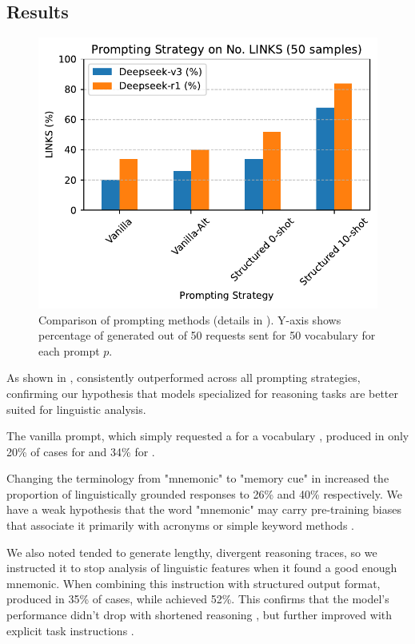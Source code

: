 \subsection{Results} \label{sec:icl-results}

\begin{figure}[htb]
  \centering
  \includegraphics[width=\linewidth]{figures/prompt_comparison.pdf}
  \caption{Comparison of prompting methods (details in ). Y-axis shows percentage of \lgms generated out of 50 requests sent for 50 vocabulary \vocab for each prompt $p$.}
  \label{fig:prompting-methods}
\end{figure}

As shown in , \teachermodel consistently outperformed \xteachermodel across all prompting strategies, confirming our hypothesis that models specialized for reasoning tasks are better suited for linguistic analysis.

The vanilla prompt, which simply requested a \lgm for a vocabulary \vocab, produced \lgms in only 20\% of cases for \xteachermodel and 34\% for \teachermodel.

Changing the terminology from "mnemonic" to "memory cue" in increased the proportion of linguistically grounded responses to 26\% and 40\% respectively. We have a weak hypothesis that the word "mnemonic" may carry pre-training biases that associate it primarily with acronyms or simple keyword methods \citep{hackmannWordImportanceExplains2024}.

We also noted \teachermodel tended to generate lengthy, divergent reasoning traces, so we instructed it to stop analysis of linguistic features when it found a good enough mnemonic. When combining this instruction with structured output format, \xteachermodel produced \lgms in 35\% of cases, while \teachermodel achieved 52\%. This confirms that the model's performance didn't drop with shortened reasoning \citep{xuChainDraftThinking2025}, but further improved with explicit task instructions \citep{yinDidYouRead2023}.

